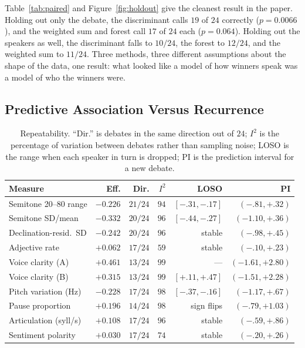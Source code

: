 \documentclass[journal]{IEEEtran}
\begin{document}
Table~\ref{tab:paired} and Figure~\ref{fig:holdout} give the cleanest
result in the paper. Holding out only the debate, the discriminant calls
$19$ of $24$ correctly ($p = 0.0066$), and the weighted sum and forest call
$17$ of $24$ each ($p = 0.064$). Holding out the speakers as well, the
discriminant falls to $10/24$, the forest to $12/24$, and the weighted sum
to $11/24$. Three methods, three different assumptions about the shape of
the data, one result: what looked like a model of how winners speak was a
model of who the winners were.

\subsection{Predictive Association Versus Recurrence}
\label{sec:method:recurrence}

\begin{table}[t]
\caption{Repeatability. ``Dir.'' is debates in the same direction out of $24$;
$I^2$ is the percentage of variation between debates rather than sampling
noise; LOSO is the range when each speaker in turn is dropped; PI is the
prediction interval for a new debate.}
\label{tab:grid}
\centering
\scriptsize
\setlength{\tabcolsep}{2pt}
\begin{tabular}{lrrrrr}
\toprule
Measure & Eff. & Dir. & $I^2$ & LOSO & PI \\
\midrule
Semitone 20--80 range & $-0.226$ & $21/24$ & $94$ & $[-.31,-.17]$ & $(-.81,+.32)$ \\
Semitone SD/mean      & $-0.332$ & $20/24$ & $96$ & $[-.44,-.27]$ & $(-1.10,+.36)$ \\
Declination-resid.\ SD & $-0.242$ & $20/24$ & $96$ & stable       & $(-.98,+.45)$ \\
Adjective rate        & $+0.062$ & $17/24$ & $59$ & stable        & $(-.10,+.23)$ \\
Voice clarity (A)     & $+0.461$ & $13/24$ & $99$ & ---           & $(-1.61,+2.80)$ \\
Voice clarity (B)     & $+0.315$ & $13/24$ & $99$ & $[+.11,+.47]$ & $(-1.51,+2.28)$ \\
Pitch variation (Hz)  & $-0.228$ & $17/24$ & $98$ & $[-.37,-.16]$ & $(-1.17,+.67)$ \\
Pause proportion      & $+0.196$ & $14/24$ & $98$ & sign flips    & $(-.79,+1.03)$ \\
Articulation (syll/s) & $+0.108$ & $17/24$ & $96$ & stable        & $(-.59,+.86)$ \\
Sentiment polarity    & $+0.030$ & $17/24$ & $74$ & stable        & $(-.20,+.26)$ \\
\bottomrule
\end{tabular}
\end{table}
\end{document}
